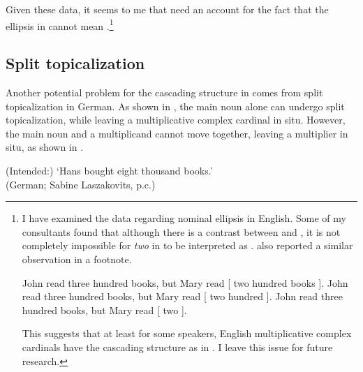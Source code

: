 \documentclass[output=paper]{langscibook}
\begin{document}
\noindent Given these data, it seems to me that \citet{IoninMatushansky2018} need an account for the fact that the ellipsis in  cannot mean .\footnote{I have examined the data regarding nominal ellipsis in English. Some of my consultants found that although there is a contrast between  and , it is not completely impossible for \textit{two} in  to be interpreted as . \citet[338]{IoninMatushansky2006} also reported a similar observation in a footnote. 

\ea\label{tat:elli}
\ea John read three hundred books, but Mary read [ two hundred books ].
\ex\label{tat:ellib} John read three hundred books, but Mary read [ two hundred ].
\ex\label{tat:ellic} John read three hundred books, but Mary read [ two ].
\z\z

\noindent This suggests that at least for some speakers, English multiplicative complex cardinals have the cascading structure as in . I leave this issue for future research.}

\subsection{Split topicalization}\label{tat:sec:top}
Another potential problem for the cascading structure in  comes from split topicalization in German. As shown in , the main noun alone can undergo split topicalization, while leaving a multiplicative complex cardinal in situ. However, the main noun and a multiplicand cannot move together, leaving a multiplier in situ, as shown in .
 
\ea\label{tat:top}
\z
\glt (Intended:) `Hans bought eight thousand books.' 
     \\\hfill(German; Sabine Laszakovits, p.c.)
 \z
\end{document}
